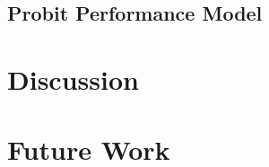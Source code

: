 \documentclass[botnum, fleqn]{unmeethesis}
\begin{document}
\section{Probit Performance Model}


\chapter{Discussion}


\chapter{Future Work}


\vspace{4\baselineskip}\vspace{-\parskip} %
\footnotesize %

\end{document}

